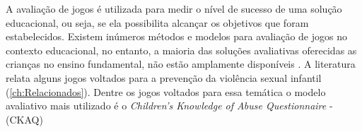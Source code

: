 


A avaliação de jogos é utilizada para medir o nível de sucesso de uma solução educacional, ou seja, se ela possibilita alcançar os objetivos que foram estabelecidos. Existem inúmeros métodos e modelos para avaliação de jogos no contexto educacional, no entanto, a maioria das soluções avaliativas oferecidas as crianças no ensino fundamental, não estão amplamente disponíveis \cite{tutty2019children}. A literatura relata alguns jogos voltados para a prevenção da violência sexual infantil (\autoref{ch:Relacionados}). Dentre os jogos voltados para essa temática o modelo avaliativo mais utilizado é o \textit{Children’s Knowledge of Abuse Questionnaire} - (CKAQ)%

